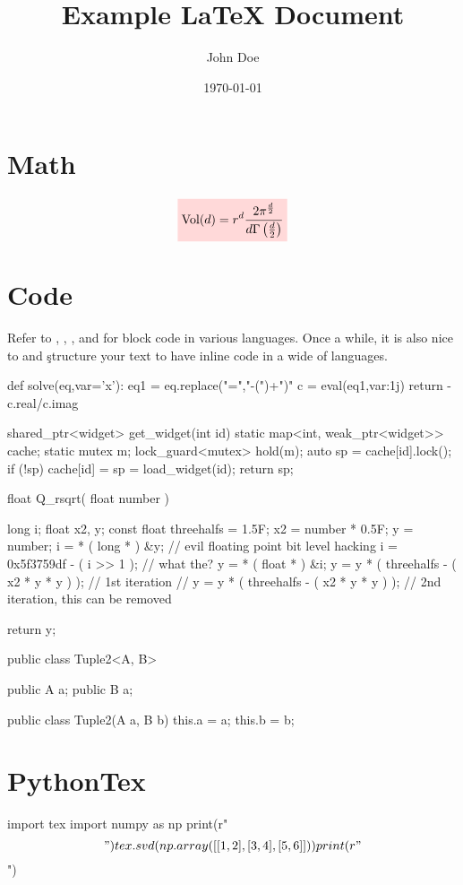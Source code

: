 \documentclass{hw}
\title{Example \LaTeX{} Document} %
\author{John Doe}                 %
\date{\today}                     %
\begin{document}
\maketitle

\section{Math}
\[\cbox{
  \text{Vol}(d) = r^d \frac{2 \pi^{\frac{d}{2}}}{d \Gamma\group{\frac{d}{2}}}
}\]


\section{Code}
Refer to , , ,
and  for block code in various languages. Once  a
while, it is also nice to  and \c{struct}ure your text to have inline
code in a wide  of languages.

\begin{Python}[%
  label=list:eqn-solver,
  caption=Linear equation solver from ActiveState
]
def solve(eq,var='x'):
    eq1 = eq.replace("=","-(")+")"
    c = eval(eq1,{var:1j})
    return -c.real/c.imag
\end{Python}

\begin{CPP}[%
  label=list:herb-sutter,
  caption=Herb Sutter's favorite ten-liner
]
shared_ptr<widget> get_widget(int id) {
    static map<int, weak_ptr<widget>> cache;
    static mutex m;
    lock_guard<mutex> hold(m);
    auto sp = cache[id].lock();
    if (!sp) cache[id] = sp = load_widget(id);
    return sp;
}
\end{CPP}

\begin{C}[%
  label=list:fast-inv-sqrt,
  caption=Fast inverse squareroot
]
float Q_rsqrt( float number ) {
    long i;
    float x2, y;
    const float threehalfs = 1.5F;
    x2 = number * 0.5F;
    y  = number;
    i  = * ( long * ) &y;                       // evil floating point bit level hacking
    i  = 0x5f3759df - ( i >> 1 );               // what the?
    y  = * ( float * ) &i;
    y  = y * ( threehalfs - ( x2 * y * y ) );   // 1st iteration
//  y  = y * ( threehalfs - ( x2 * y * y ) );   // 2nd iteration, this can be removed

    return y;
}
\end{C}

\begin{Java}[%
    label=list:tuples,
    caption=Generic Two Tuples
]
public class Tuple2<A, B> {
    public A a;
    public B a;

    public class Tuple2(A a, B b) {
        this.a = a;
        this.b = b;
    }
}
\end{Java}

\section{PythonTex}
\begin{pycode}
import tex
import numpy as np
print(r"\[")
tex.svd(np.array([[1,2],[3,4],[5,6]]))
print(r"\]")
\end{pycode}
\end{document}
